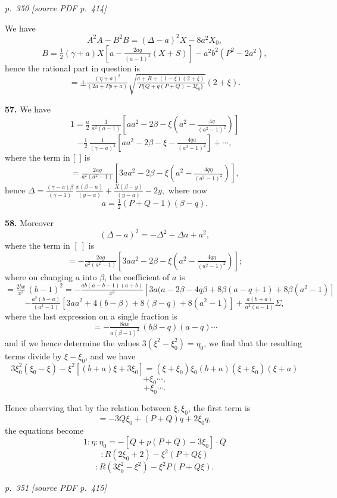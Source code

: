 \documentclass[11pt,a4paper]{article}
\newcommand{\pagemarker}[2]{\par\bigskip\noindent\textit{p.~#1 [source PDF p.~#2]}\par\smallskip}
\begin{document}
\clearpage

\bigskip
\pagemarker{350}{414}
\smallskip

We have
\[
A^2A - B^2B = (\Delta - a)^2 X - 8a^2 X_0,
\]
\[
B = \tfrac{1}{2}(\gamma + a)X\!\left[a - \tfrac{2aq}{(a - 1)^2}(X + S)\right] - a^2 b^2(P^2 - 2a^2),
\]
hence the rational part in question is
\[
= \pm \tfrac{(\eta + a)^2}{(2a + Pp + a)}\sqrt{\tfrac{a + R + (1 - \xi)(2 + \xi)}{P\{Q + q(P + Q) - 3\xi_0\}}}(2 + \xi).
\]

\textbf{57.} We have
\[
1 = \tfrac{a}{2}\,\tfrac{1}{a^2(a - 1)}\!\left[a a^2 - 2\beta - \xi\!\left(a^2 - \tfrac{4q}{(a^2 - 1)^2}\right)\right]
\]
\[
- \tfrac{1}{2}\,\tfrac{1}{(\gamma - a)^2}\!\left[a a^2 - 2\beta - \xi - \tfrac{4qa}{(a^2 - 1)^2}\right] + \cdots,
\]
where the term in [\ ] is
\[
= \tfrac{2ag}{a^2(a^2 - 1)}\!\left[3a a^2 - 2\beta - \xi\!\left(a^2 - \tfrac{4q\eta}{(a^2 - 1)^2}\right)\right],
\]
hence $\Delta = \tfrac{(\gamma - a)\beta}{(\gamma - 1)}\,\tfrac{x(\beta - a)}{(y - a)} + \tfrac{X(\beta - y)}{(y - a)} - 2y,$
where now
\[
a = \tfrac{1}{2}(P + Q - 1)(\beta - q).
\]

\textbf{58.} Moreover
\[
(\Delta - a)^2 = -\Delta^2 - \Delta a + a^2,
\]
where the term in $[\ ]$ is
\[
= -\tfrac{2ag}{a^2(a^2 - 1)}\!\left[3a a^2 - 2\beta - \xi\!\left(a^2 - \tfrac{4q\eta}{(a^2 - 1)^2}\right)\right];
\]
where on changing $a$ into $\beta$, the coefficient of $a$ is
\[
= \tfrac{2bx}{x^2}\,(b - 1)^2 = -\tfrac{ab(a - b - 1)(a + b)}{x^2}\!\left[3a(a - 2\beta - 4q\beta + 8\beta(a - q + 1) + 8\beta(a^2 - 1)\right]
\]
\[
- \tfrac{a^2(b - a)}{(a^2 - 1)}\!\left[3a a^2 + 4(b - \beta) + 8(\beta - q) + 8(a^2 - 1)\right] + \tfrac{a(b + a)}{a^2(a - 1)}\Sigma,
\]
where the last expression on a single fraction is
\[
= -\tfrac{8ax}{a(\beta - 1)^2}\,(b\beta - q)(a - q)\cdots
\]
and if we hence determine the values $3(\xi^2 - \xi_0^2) = \eta_0$, we find that the resulting terms divide by $\xi - \xi_0$, and we have
\[
3\xi_0^2(\xi_0 - \xi) - \xi^2[(b + a)\xi + 3\xi_0] = (\xi + \xi_0)\xi_0(b + a)(\xi + \xi_0)(\xi + a)
\]
\[
+ \xi_0 \cdots,
\]
\[
+ \xi_0 \cdots.
\]

Hence observing that by the relation between $\xi, \xi_0$, the first term is
\[
= -3Q\xi_0 + (P + Q)q + 2\xi_0 q,
\]
the equations become
\[
1: \eta : \eta_0 = -[Q + p(P + Q) - 3\xi_0] \cdot Q
\]
\[
: R(2\xi_0 + 2) - \xi^2(P + Q\xi)
\]
\[
: R(3\xi_0^2 - \xi^2) - \xi^2 P(P + Q\xi).
\]

\clearpage

\bigskip
\pagemarker{351}{415}
\smallskip
\end{document}
